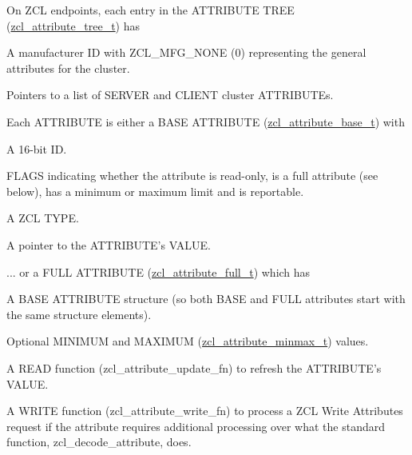 \begin{DoxyItemize}
\item On Z\-C\-L endpoints, each entry in the A\-T\-T\-R\-I\-B\-U\-T\-E T\-R\-E\-E (\hyperlink{structzcl__attribute__tree__t}{zcl\-\_\-attribute\-\_\-tree\-\_\-t}) has
\begin{DoxyItemize}
\item A manufacturer I\-D with Z\-C\-L\-\_\-\-M\-F\-G\-\_\-\-N\-O\-N\-E (0) representing the general attributes for the cluster.
\item Pointers to a list of S\-E\-R\-V\-E\-R and C\-L\-I\-E\-N\-T cluster A\-T\-T\-R\-I\-B\-U\-T\-Es.
\end{DoxyItemize}
\item Each A\-T\-T\-R\-I\-B\-U\-T\-E is either a B\-A\-S\-E A\-T\-T\-R\-I\-B\-U\-T\-E (\hyperlink{structzcl__attribute__base__t}{zcl\-\_\-attribute\-\_\-base\-\_\-t}) with
\begin{DoxyItemize}
\item A 16-\/bit I\-D.
\item F\-L\-A\-G\-S indicating whether the attribute is read-\/only, is a full attribute (see below), has a minimum or maximum limit and is reportable.
\item A Z\-C\-L T\-Y\-P\-E.
\item A pointer to the A\-T\-T\-R\-I\-B\-U\-T\-E's V\-A\-L\-U\-E.
\end{DoxyItemize}
\item ... or a F\-U\-L\-L A\-T\-T\-R\-I\-B\-U\-T\-E (\hyperlink{structzcl__attribute__full__t}{zcl\-\_\-attribute\-\_\-full\-\_\-t}) which has
\begin{DoxyItemize}
\item A B\-A\-S\-E A\-T\-T\-R\-I\-B\-U\-T\-E structure (so both B\-A\-S\-E and F\-U\-L\-L attributes start with the same structure elements).
\item Optional M\-I\-N\-I\-M\-U\-M and M\-A\-X\-I\-M\-U\-M (\hyperlink{unionzcl__attribute__minmax__t}{zcl\-\_\-attribute\-\_\-minmax\-\_\-t}) values.
\item A R\-E\-A\-D function (zcl\-\_\-attribute\-\_\-update\-\_\-fn) to refresh the A\-T\-T\-R\-I\-B\-U\-T\-E's V\-A\-L\-U\-E.
\item A W\-R\-I\-T\-E function (zcl\-\_\-attribute\-\_\-write\-\_\-fn) to process a Z\-C\-L Write Attributes request if the attribute requires additional processing over what the standard function, zcl\-\_\-decode\-\_\-attribute, does.
\end{DoxyItemize}
\end{DoxyItemize}

